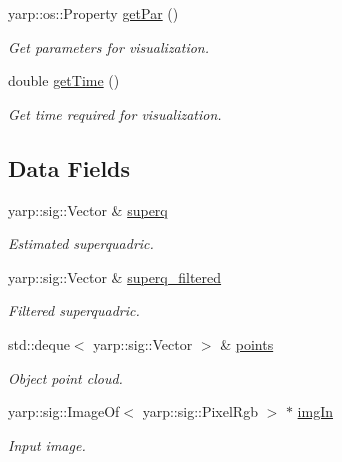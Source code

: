 \begin{DoxyCompactItemize}
yarp\+::os\+::\+Property \mbox{\hyperlink{classSuperqVisualization_ae4fac8f79629a3fa81a688ab4baf61f7}{get\+Par}} ()
\begin{DoxyCompactList}\small\item\em Get parameters for visualization. \end{DoxyCompactList}\item 
double \mbox{\hyperlink{classSuperqVisualization_a9583b378f68f466a76022817d3051c6e}{get\+Time}} ()
\begin{DoxyCompactList}\small\item\em Get time required for visualization. \end{DoxyCompactList}\end{DoxyCompactItemize}
\subsection*{Data Fields}
\begin{DoxyCompactItemize}
\item 
\mbox{\label{classSuperqVisualization_a57358b13afc9b5aa3920b7c96b20b26d}} 
yarp\+::sig\+::\+Vector \& \mbox{\hyperlink{classSuperqVisualization_a57358b13afc9b5aa3920b7c96b20b26d}{superq}}
\begin{DoxyCompactList}\small\item\em Estimated superquadric. \end{DoxyCompactList}\item 
\mbox{\label{classSuperqVisualization_aed6197ba510529ed07d32a1a86a48e83}} 
yarp\+::sig\+::\+Vector \& \mbox{\hyperlink{classSuperqVisualization_aed6197ba510529ed07d32a1a86a48e83}{superq\+\_\+filtered}}
\begin{DoxyCompactList}\small\item\em Filtered superquadric. \end{DoxyCompactList}\item 
\mbox{\label{classSuperqVisualization_aa00fb7590a7bc410387e041fbdfb162a}} 
std\+::deque$<$ yarp\+::sig\+::\+Vector $>$ \& \mbox{\hyperlink{classSuperqVisualization_aa00fb7590a7bc410387e041fbdfb162a}{points}}
\begin{DoxyCompactList}\small\item\em Object point cloud. \end{DoxyCompactList}\item 
\mbox{\label{classSuperqVisualization_a599776b35fd931a41a9bf6416e639275}} 
yarp\+::sig\+::\+Image\+Of$<$ yarp\+::sig\+::\+Pixel\+Rgb $>$ $\ast$ \mbox{\hyperlink{classSuperqVisualization_a599776b35fd931a41a9bf6416e639275}{img\+In}}
\begin{DoxyCompactList}\small\item\em Input image. \end{DoxyCompactList}\end{DoxyCompactItemize}
